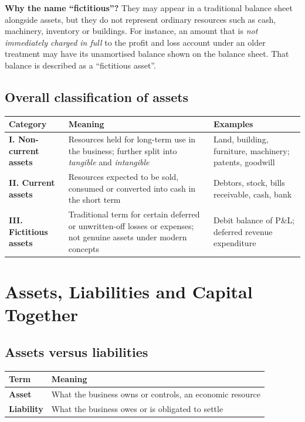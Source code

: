 \documentclass[11pt,a4paper]{article}
\begin{document}
\textbf{Why the name ``fictitious''?} They may appear in a traditional balance sheet alongside assets, but
they do not represent ordinary resources such as cash, machinery, inventory or buildings. For instance, an
amount that is \emph{not immediately charged in full} to the profit and loss account under an older treatment may
have its unamortised balance shown on the balance sheet. That balance is described as a ``fictitious asset''.

\subsection{Overall classification of assets}

\begin{center}
\small
\begin{tabularx}{\textwidth}{@{}l Y Y@{}}
\toprule
{}\textbf{Category} & \textbf{Meaning} & \textbf{Examples}\\
\midrule
\textbf{I. Non-current assets} & Resources held for long-term use in the business; further split into \emph{tangible} and \emph{intangible} & Land, building, furniture, machinery; patents, goodwill\\
\textbf{II. Current assets} & Resources expected to be sold, consumed or converted into cash in the short term & Debtors, stock, bills receivable, cash, bank\\
\textbf{III. Fictitious assets} & Traditional term for certain deferred or unwritten-off losses or expenses; not genuine assets under modern concepts & Debit balance of P\&L; deferred revenue expenditure\\
\bottomrule
\end{tabularx}
\end{center}

\section{Assets, Liabilities and Capital Together}

\subsection{Assets versus liabilities}

\begin{center}
\small
\begin{tabularx}{\textwidth}{@{}l Y@{}}
\toprule
{}\textbf{Term} & \textbf{Meaning}\\
\midrule
\textbf{Asset} & What the business owns or controls, an economic resource\\
\textbf{Liability} & What the business owes or is obligated to settle\\
\bottomrule
\end{tabularx}
\end{center}
\end{document}
